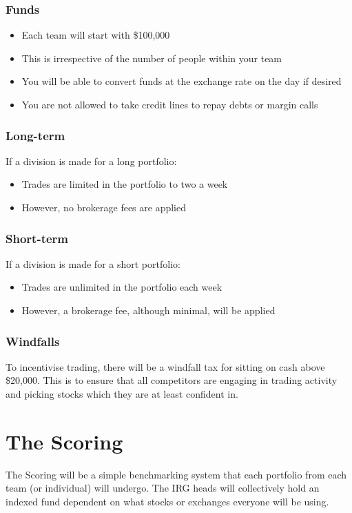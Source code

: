 \documentclass[a4paper]{article}
\begin{document}
{\subsubsection{Funds}
\begin{itemize}
	\item Each team will start with \$100,000
	\item This is irrespective of the number of people within your team
	\item You will be able to convert funds at the exchange rate on the day if desired
	\item You are not allowed to take credit lines to repay debts or margin calls
\end{itemize}

\subsubsection{Long-term}
If a division is made for a long portfolio:
\begin{itemize}
	\item Trades are limited in the portfolio to two a week
	\item However, no brokerage fees are applied
\end{itemize}

\subsubsection{Short-term}
If a division is made for a short portfolio:
\begin{itemize}
	\item Trades are unlimited in the portfolio each week
	\item However, a brokerage fee, although minimal, will be applied
\end{itemize}

\subsubsection{Windfalls}
To incentivise trading, there will be a windfall tax for sitting on cash above \$20,000. This is to ensure that all competitors are engaging in trading activity and picking stocks which they are at least confident in.

\newpage
\section{The Scoring}
The Scoring will be a simple benchmarking system that each portfolio from each team (or individual) will undergo. The IRG heads will collectively hold an indexed fund dependent on what stocks or exchanges everyone will be using.

}
\end{document}
